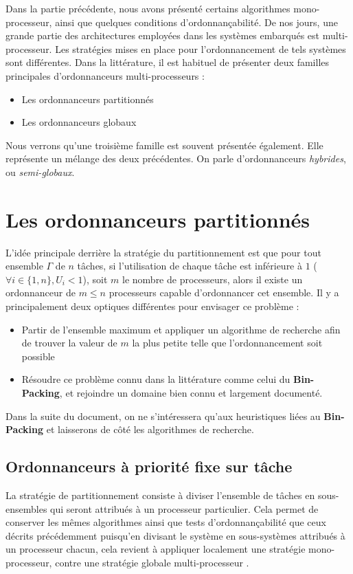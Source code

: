 \documentclass[11pt,a4paper,oneside]{report}
\newcommand{\customhighlight}[1]{{\textbf{#1}}}
\begin{document}
	Dans la partie précédente, nous avons présenté certains algorithmes mono-processeur, 
	ainsi que quelques conditions d'ordonnançabilité.
	De nos jours, une grande partie des architectures employées dans les systèmes embarqués 
	est multi-processeur. 
	Les stratégies mises en place pour l'ordonnancement de tels 
	systèmes sont différentes. Dans la littérature, il est habituel de présenter 
	deux familles principales d'ordonnanceurs multi-processeurs :\medskip
	\begin{itemize}
		\item Les ordonnanceurs partitionnés
		\item Les ordonnanceurs globaux
	\end{itemize}
	Nous verrons qu'une troisième famille est souvent présentée également. Elle représente un 
	mélange des deux précédentes. On parle d'ordonnanceurs \textit{hybrides}, ou \textit{semi-globaux}.
	
	\section{Les ordonnanceurs partitionnés}
	L'idée principale derrière la stratégie du partitionnement est que pour tout 
	ensemble $\Gamma$ de $n$ tâches, si l'utilisation de chaque tâche est inférieure à $1$ 
	($\forall i \in \{1, n\}, U_i < 1$), soit $m$ le nombre de processeurs,  
	alors il existe un ordonnanceur de $m \leq n$ processeurs capable d'ordonnancer cet ensemble. 
	Il y a principalement deux optiques différentes pour envisager ce problème : \medskip
	\begin{itemize}
		\item Partir de l'ensemble maximum et appliquer un algorithme de recherche afin de trouver 
		la valeur de $m$ la plus petite telle que l'ordonnancement soit possible
		\item Résoudre ce problème connu dans la littérature comme celui du \customhighlight{Bin-Packing}, 
		et rejoindre un domaine bien connu et largement documenté.
	\end{itemize}
	Dans la suite du document, on ne s'intéressera qu'aux heuristiques liées au \customhighlight{Bin-Packing} et 
	laisserons de côté les algorithmes de recherche.
	
	\subsection{Ordonnanceurs à priorité fixe sur tâche}
	
	La stratégie de partitionnement consiste à diviser l'ensemble de tâches en sous-ensembles qui seront 
	attribués à un processeur particulier. Cela permet de conserver les mêmes algorithmes ainsi 
	que tests d'ordonnançabilité que ceux 
	décrits précédemment puisqu'en divisant le système en sous-systèmes attribués à un 
	processeur chacun, cela revient à appliquer \og localement\fg{}  une stratégie mono-processeur, contre 
	une stratégie globale multi-processeur \cite{ndoye_ordonnancement_2014}.
	
\end{document}
